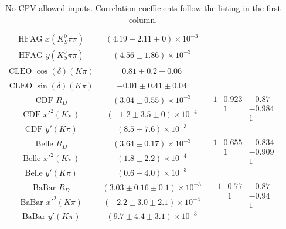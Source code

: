 \begin{table}[htdp]
\begin{center}
\begin{tabular}{|c|c|c|}
\hline
$\text{HFAG }x (K_S^0\pi\pi)$ & $(4.19\pm2.11\pm0)\times 10^{-3}$ & \\
$\text{HFAG }y (K_S^0\pi\pi)$ & $(4.56\pm1.86)\times 10^{-3}$ & \\
\hline
$\text{CLEO }\cos(\delta)(K\pi)$ & $0.81\pm0.2\pm0.06$ & \\
$\text{CLEO }\sin(\delta)(K\pi)$ & $-0.01\pm0.41\pm0.04$ & \\
\hline
$\text{CDF }R_D$ & $(3.04\pm0.55)\times10^{-3}$ & \multirow{3}{*}{$\begin{array}{ccc} 
1& 0.923 & -0.87 \\ & 1 & -0.984 \\ & & 1 \end{array}$}\\
$\text{CDF }x'^2(K\pi)$ & $(-1.2\pm3.5\pm0)\times 10^{-4}$ & \\
$\text{CDF }y'(K\pi)$ & $(8.5\pm7.6)\times10^{-3}$ & \\
\hline
$\text{Belle }R_D$ & $(3.64\pm0.17)\times 10^{-3}$ & \multirow{3}{*}{$\begin{array}{ccc}
    1 & 0.655 & -0.834\\
     & 1& -0.909 \\
     & & 1
\end{array}$}\\
$\text{Belle }x'^2(K\pi)$ & $(1.8\pm2.2)\times 10^{-4}$ & \\
$\text{Belle }y'(K\pi)$ & $(0.6\pm4.0)\times 10^{-3}$ & \\
\hline
$\text{BaBar }R_D$ & $(3.03\pm0.16\pm0.1)\times 10^{-3}$ & \multirow{3}{*}{$\begin{array}{ccc} 
    1& 0.77 & -0.87 \\
     & 1 & -0.94 \\
    & & 1
\end{array}$}\\
$\text{BaBar }x'^2(K\pi)$ & $(-2.2\pm3.0\pm2.1)\times 10^{-4}$ & \\
$\text{BaBar }y'(K\pi)$ & $(9.7\pm4.4\pm3.1)\times 10^{-3}$ & \\
\hline
\end{tabular}
\end{center}
\caption{No CPV allowed inputs. Correlation coefficients follow the listing in the first column.}
\label{table:nocpv_inputs}
\end{table}
